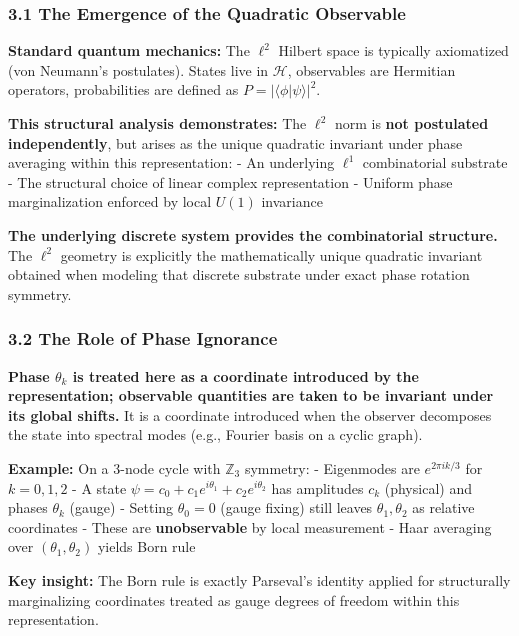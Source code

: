 \documentclass[
]{article}
\begin{document}
\subsubsection{3.1 The Emergence of the Quadratic
Observable}\label{the-emergence-of-the-quadratic-observable}

\textbf{Standard quantum mechanics:} The \(\ell^2\) Hilbert space is
typically axiomatized (von Neumann's postulates). States live in
\(\mathcal{H}\), observables are Hermitian operators, probabilities are
defined as \(P = |\langle \phi | \psi \rangle|^2\).

\textbf{This structural analysis demonstrates:} The \(\ell^2\) norm is
\textbf{not postulated independently}, but arises as the unique
quadratic invariant under phase averaging within this representation: -
An underlying \(\ell^1\) combinatorial substrate - The structural choice
of linear complex representation - Uniform phase marginalization
enforced by local \(U(1)\) invariance

\textbf{The underlying discrete system provides the combinatorial
structure.} The \(\ell^2\) geometry is explicitly the mathematically
unique quadratic invariant obtained when modeling that discrete
substrate under exact phase rotation symmetry.

\subsubsection{3.2 The Role of Phase
Ignorance}\label{the-role-of-phase-ignorance}

\textbf{Phase \(\theta_k\) is treated here as a coordinate introduced by
the representation; observable quantities are taken to be invariant
under its global shifts.} It is a coordinate introduced when the
observer decomposes the state into spectral modes (e.g., Fourier basis
on a cyclic graph).

\textbf{Example:} On a 3-node cycle with \(\mathbb{Z}_3\) symmetry: -
Eigenmodes are \(e^{2\pi i k/3}\) for \(k=0,1,2\) - A state
\(\psi = c_0 + c_1 e^{i\theta_1} + c_2 e^{i\theta_2}\) has amplitudes
\(c_k\) (physical) and phases \(\theta_k\) (gauge) - Setting
\(\theta_0 = 0\) (gauge fixing) still leaves \(\theta_1, \theta_2\) as
relative coordinates - These are \textbf{unobservable} by local
measurement - Haar averaging over \((\theta_1, \theta_2)\) yields Born
rule

\textbf{Key insight:} The Born rule is exactly Parseval's identity
applied for structurally marginalizing coordinates treated as gauge
degrees of freedom within this representation.
\end{document}
